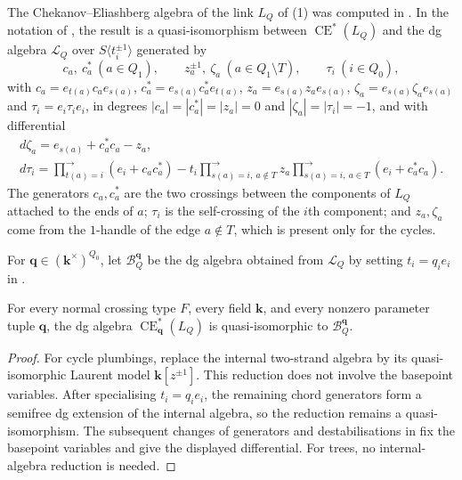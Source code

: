 \documentclass[a4paper]{amsart}
\newcommand{\kk}{\mathbf{k}}
\DeclareMathOperator{\CE}{CE}
\numberwithin{equation}{section}
\begin{document}
The Chekanov--Eliashberg algebra of the link $L_Q$ of
(1) was computed in
\cite[Theorem~17]{ELplumbing}. In the notation of
, the result is a quasi-isomorphism
between $\CE^*(L_Q)$ and the dg algebra $\mathcal L_Q$ over
$S\langle t_i^{\pm1}\rangle$ generated by
\[
 c_a,\ c_a^*\ (a\in Q_1),\qquad
 z_a^{\pm1},\ \zeta_a\ (a\in Q_1\setminus T),\qquad
 \tau_i\ (i\in Q_0),
\]
with $c_a=e_{t(a)}c_ae_{s(a)}$, $c_a^*=e_{s(a)}c_a^*e_{t(a)}$,
$z_a=e_{s(a)}z_ae_{s(a)}$, $\zeta_a=e_{s(a)}\zeta_ae_{s(a)}$ and
$\tau_i=e_i\tau_ie_i$, in degrees
$|c_a|=|c_a^*|=|z_a|=0$ and $|\zeta_a|=|\tau_i|=-1$, and with
differential
\begin{equation}\label{eq:el-differential}
\begin{gathered}
 d\zeta_a=e_{s(a)}+c_a^*c_a-z_a,\\
 d\tau_i=\prod_{t(a)=i}^{\longrightarrow}(e_i+c_ac_a^*)
  -t_i\prod_{s(a)=i,\ a\notin T}^{\longrightarrow}z_a
   \prod_{s(a)=i,\ a\in T}^{\longrightarrow}(e_i+c_a^*c_a).
\end{gathered}
\end{equation}
The generators $c_a,c_a^*$ are the two crossings between the components
of $L_Q$ attached to the ends of $a$; $\tau_i$ is the self-crossing of
the $i$th component; and $z_a,\zeta_a$ come from the $1$-handle of the
edge $a\notin T$, which is present only for the cycles.

\begin{definition}\label{def:plumbing-dga}
For $\boldsymbol q\in(\kk^\times)^{Q_0}$, let
$\mathcal B_Q^{\boldsymbol q}$ be the dg algebra obtained from
$\mathcal L_Q$ by setting $t_i=q_ie_i$ in
.
\end{definition}

\begin{theorem}\label{thm:plumbing-ce}
For every normal crossing type $F$, every field $\kk$, and every
nonzero parameter tuple $\boldsymbol q$, the dg algebra
$\CE^*_{\boldsymbol q}(L_Q)$ is quasi-isomorphic to
$\mathcal B_Q^{\boldsymbol q}$.
\end{theorem}

\begin{proof}
For cycle plumbings, \cite[Theorem~12 and Proposition~14]{ELplumbing}
replace the internal two-strand algebra by its quasi-isomorphic Laurent
model $\kk[z^{\pm1}]$. This reduction does not involve the basepoint
variables. After specialising $t_i=q_ie_i$, the remaining chord
generators form a semifree dg extension of the internal algebra, so the
reduction remains a quasi-isomorphism. The subsequent changes of
generators and destabilisations in
\cite[Lemma~16 and Theorem~17]{ELplumbing} fix the basepoint variables
and give the displayed differential. For trees, no internal-algebra
reduction is needed.
\end{proof}
\end{document}
